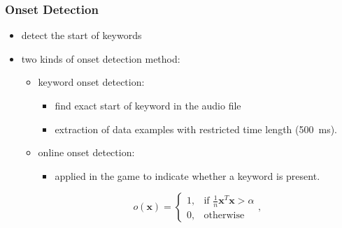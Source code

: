 \begin{frame}
  \frametitle{Onset Detection}
  \begin{itemize}
    \item detect the start of keywords
    \item two kinds of onset detection method:
    \begin{itemize}
      \item keyword onset detection:
      \begin{itemize}
        \item find exact start of keyword in the audio file
        \item extraction of data examples with restricted time length (\SI{500}{\milli\second}).
      \end{itemize}
      \vspace{0.25cm}
      \item online onset detection:
      \begin{itemize}
        \item applied in the game to indicate whether a keyword is present.
      \end{itemize}
      \vspace{0.25cm}
      \begin{equation*}
        o(\bm{x}) = 
        \begin{cases}
          1, & \text{if } \frac{1}{n} \bm{x}^T \bm{x} > \alpha\\
          0, & \text{otherwise} 
        \end{cases},
      \end{equation*}
    \end{itemize}
  \end{itemize}
\end{frame}

